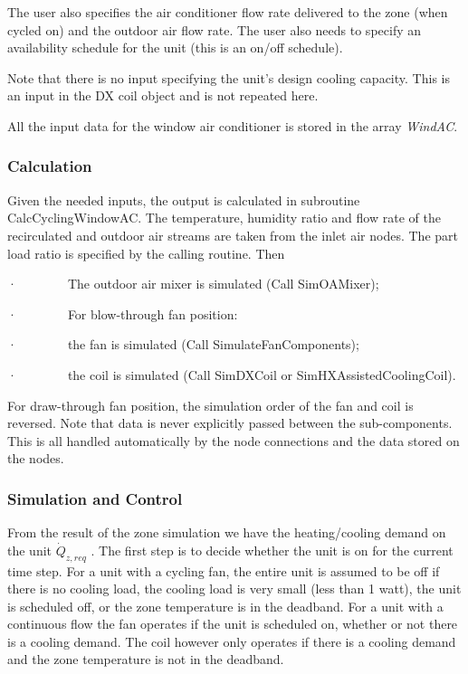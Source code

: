 The user also specifies the air conditioner flow rate delivered to the zone (when cycled on) and the outdoor air flow rate. The user also needs to specify an availability schedule for the unit (this is an on/off schedule).

Note that there is no input specifying the unit's design cooling capacity. This is an input in the DX coil object and is not repeated here.

All the input data for the window air conditioner is stored in the array \emph{WindAC}.

\subsubsection{Calculation}\label{calculation-4}

Given the needed inputs, the output is calculated in subroutine CalcCyclingWindowAC. The temperature, humidity ratio and flow rate of the recirculated and outdoor air streams are taken from the inlet air nodes. The part load ratio is specified by the calling routine. Then

·~~~~~~~~The outdoor air mixer is simulated (Call SimOAMixer);

·~~~~~~~~For blow-through fan position:

·~~~~~~~~the fan is simulated (Call SimulateFanComponents);

·~~~~~~~~the coil is simulated (Call SimDXCoil or SimHXAssistedCoolingCoil).

For draw-through fan position, the simulation order of the fan and coil is reversed. Note that data is never explicitly passed between the sub-components. This is all handled automatically by the node connections and the data stored on the nodes.

\subsubsection{Simulation and Control}\label{simulation-and-control-4-000}

From the result of the zone simulation we have the heating/cooling demand on the unit \({\dot Q_{z,req}}\) . The first step is to decide whether the unit is on for the current time step. For a unit with a cycling fan, the entire unit is assumed to be off if there is no cooling load, the cooling load is very small (less than 1 watt), the unit is scheduled off, or the zone temperature is in the deadband. For a unit with a continuous flow the fan operates if the unit is scheduled on, whether or not there is a cooling demand. The coil however only operates if there is a cooling demand and the zone temperature is not in the deadband.

